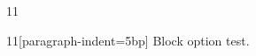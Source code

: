 \documentclass[paper=A4]{ropas-poster}
\begin{document}
\begin{postergrid}{1}{1}
\begin{posterblock}{1}{1}[paragraph-indent=5bp]
Block option test.
\end{posterblock}
\end{postergrid}
\end{document}
